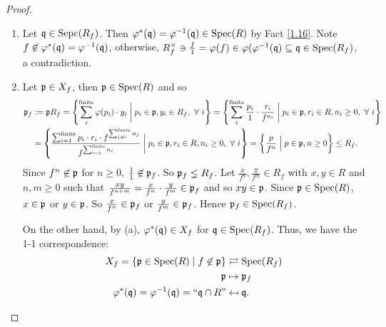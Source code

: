 \begin{proof}
    \begin{enumerate}
        \item Let $\mathfrak{q} \in \operatorname{Sepc}(R_f)$. Then $\varphi^*(\mathfrak{q}) = \varphi^{-1}(\mathfrak{q}) \in \operatorname{Spec}(R)$ by Fact \ref{1.16}. Note $f \not \in \varphi^*(\mathfrak{q}) = \varphi^{-1}(\mathfrak{q})$, otherwise, $R_f^\times \ni \frac{f}{1} = \varphi(f) \in \varphi(\varphi^{-1}(\mathfrak{q}) \subseteq \mathfrak{q} \in \operatorname{Spec}(R_f)$, a contradiction. 
        \item 
            Let $\mathfrak{p} \in X_f$, then $\mathfrak{p} \in \operatorname{Spec}(R)$ and so
            \begin{align*}
                \mathfrak{p}_f &:= \mathfrak{p} R_f = \left\{\sum_{i}^{\text{finite}} \varphi(p_{i}) \cdot y_{i} \mathrel{\bigg |} p_{i} \in \mathfrak{p},y_{i} \in R_{f}, \ \forall \  i\right\} = \left\{\sum_{i}^{\text{finite}} \frac{p_{i}}{1} \cdot \frac{r_{i}}{f^{n_{i}}} \mathrel{\bigg |} p_{i} \in \mathfrak{p}, r_{i} \in R, n_{i} \geq 0,\ \forall \  i\right\} \\
                &= \left\{\frac{\sum_{i=1}^{\text{finite}}p_{i} \cdot r_{i} \cdot f^{\sum_{j \neq i}^{\text{finite}}n_{j}}}{f^{\sum_{i=1}^{\text{finite}} n_{i}}} \mathrel{\bigg |} p_{i} \in \mathfrak{p}, r_{i} \in R, n_{i} \geq 0, \ \forall \  i\right\} = \left\{ \frac{p}{f^{n}} \mathrel{\Big |} p \in \mathfrak{p},n \geq 0\right\} \leq R_f.
            \end{align*}
            Since $f^n \not \in \mathfrak{p}$ for $n \geq 0$, $\frac{1}{1} \not \in \mathfrak{p}_f$. So $\mathfrak{p}_f \lneq R_f$. Let $\frac{x}{f^n},\frac{y}{f^m} \in R_f$ with $x,y \in R$ and $n,m \geq 0$ such that $\frac{xy}{f^{n+m}} = \frac{x}{f^n} \cdot \frac{y}{f^m} \in \mathfrak{p}_f$ and so $xy \in \mathfrak{p}$. Since $\mathfrak{p} \in \operatorname{Spec}(R)$, $x \in \mathfrak{p}$ or $y \in \mathfrak{p}$. So $\frac{x}{f^n} \in \mathfrak{p}_f$ or $\frac{y}{f^m} \in \mathfrak{p}_f$. Hence $\mathfrak{p}_f \in \operatorname{Spec}(R_f)$. \par 
            On the other hand, by (a), $\varphi^{*}(\mathfrak{q}) \in X_{f}$ for $\mathfrak{q} \in \operatorname{Spec}(R_{f})$. Thus, we have the 1-1 correspondence:
            \begin{align*}
                X_f = \{\mathfrak{p} \in \operatorname{Spec}(R) \mid f \not \in \mathfrak{p}\} & \rightleftarrows \operatorname{Spec}(R_f) \\
                \mathfrak{p} &\mapsto \mathfrak{p}_f \\ 
                \varphi^*(\mathfrak{q}) = \varphi^{-1}(\mathfrak{q}) = \text{``$\mathfrak{q} \cap R$''} &\mapsfrom \mathfrak{q}. \qedhere
            \end{align*}
    \end{enumerate}
\end{proof}

